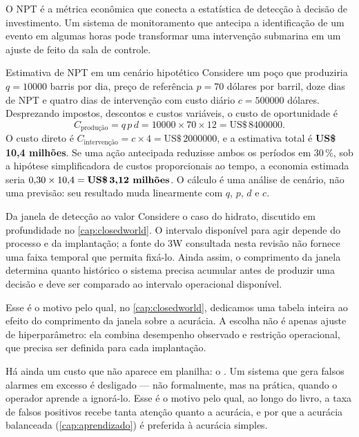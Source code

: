 O NPT é a métrica econômica que conecta a estatística de detecção à decisão de
investimento. Um sistema de monitoramento que antecipa a identificação de um evento em
algumas horas pode transformar uma intervenção submarina em um ajuste de 
feito da sala de controle.

\begin{exemplo}{Estimativa de NPT em um cenário hipotético}
Considere um poço que produziria $q=\num{10000}$ barris por dia, preço de referência
$p=\num{70}$ dólares por barril, doze dias de NPT e quatro dias de intervenção com custo
diário $c=\num{500000}$ dólares. Desprezando impostos, descontos e custos variáveis, o
custo de oportunidade é
\[
      C_{\text{produção}} = q\,p\,d
      = \num{10000}\times\num{70}\times 12
      = \text{US\$}\,\num{8400000}.
\]
O custo direto é $C_{\text{intervenção}}=c\times4=\text{US\$}\,\num{2000000}$, e a
estimativa total é \textbf{US\$\,10,4 milhões}. Se uma ação antecipada reduzisse ambos
os períodos em $30\,\%$, sob a hipótese simplificadora de custos proporcionais ao
tempo, a economia estimada seria $0{,}30\times 10{,}4 =
\textbf{US\$\,3,12 milhões}$. O cálculo é uma análise de cenário, não uma previsão: seu
resultado muda linearmente com $q$, $p$, $d$ e $c$.
\end{exemplo}

\begin{exemplo}{Da janela de detecção ao valor}
Considere o caso do hidrato, discutido em profundidade no \cref{cap:closedworld}.
O intervalo disponível para agir depende do processo e da implantação; a fonte do 3W
consultada nesta revisão não fornece uma faixa temporal que permita fixá-lo. Ainda
assim, o comprimento da janela determina quanto histórico o sistema precisa acumular
antes de produzir uma decisão e deve ser comparado ao intervalo operacional disponível.

Esse é o motivo pelo qual, no \cref{cap:closedworld}, dedicamos uma tabela inteira ao
efeito do comprimento da janela sobre a acurácia. A escolha não é apenas ajuste de
hiperparâmetro: ela combina desempenho observado e restrição operacional, que precisa
ser definida para cada implantação.
\end{exemplo}

Há ainda um custo que não aparece em planilha: o . Um sistema que gera falsos alarmes em excesso é desligado --- não
formalmente, mas na prática, quando o operador aprende a ignorá-lo. Esse é o motivo
pelo qual, ao longo do livro, a taxa de falsos positivos recebe tanta atenção quanto a
acurácia, e por que a acurácia balanceada (\cref{cap:aprendizado}) é preferida à
acurácia simples.

